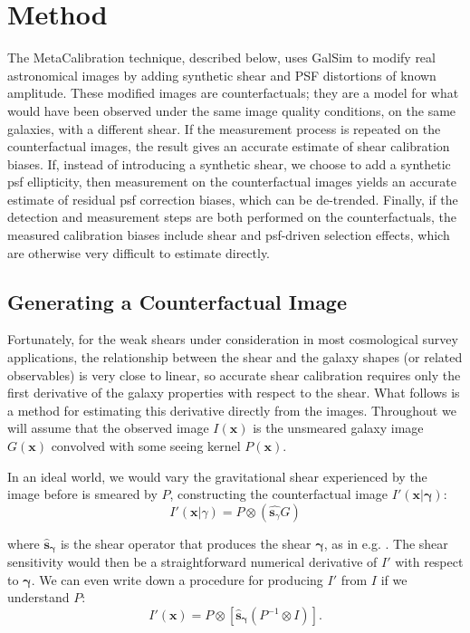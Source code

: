 \documentclass[iop]{emulateapj}
\begin{document}
\section{Method}
The MetaCalibration technique, described below, uses GalSim
\citep{2015A&C....10..121R} to modify real astronomical images by
adding synthetic shear and PSF distortions of known amplitude. These
modified images are counterfactuals; they are a model for what would
have been observed under the same image quality conditions, on the
same galaxies, with a different shear. If the measurement process is
repeated on the counterfactual images, the result gives an accurate
estimate of shear calibration biases. If, instead of introducing a
synthetic shear, we choose to add a synthetic psf ellipticity, then
measurement on the counterfactual images yields an accurate estimate
of residual psf correction biases, which can be de-trended.  Finally,
if the detection and measurement steps are both performed on the
counterfactuals, the measured calibration biases include shear and
psf-driven selection effects, which are otherwise very difficult to
estimate directly.

\subsection{Generating a Counterfactual Image}
Fortunately, for the weak shears under consideration in most
cosmological survey applications, the relationship between the shear
and the galaxy shapes (or related observables) is very close to
linear, so accurate shear calibration requires only the first
derivative of the galaxy properties with respect to the shear. What
follows is a method for estimating this derivative directly from the
images. Throughout we will assume that the observed image
$I({\mathbf{x}})$ is the unsmeared galaxy image $G(\mathbf{x})$
convolved with some seeing kernel $P(\mathbf{x})$.

In an ideal world, we would vary the gravitational shear experienced
by the image before is smeared by $P$, constructing the counterfactual
image $I'(\mathbf{x}| {\boldsymbol \gamma})$:
\begin{equation}
  I'({\mathbf{x}}|\gamma) = P \otimes\left( \hat{\mathbf{s}_{\gamma}}G\right)
\end{equation}

where $\hat{\mathbf{s}}_{\boldsymbol \gamma}$ is the shear operator that produces the shear
${\boldsymbol \gamma}$, as in e.g. \cite{2002AJ....123..583B}. The
shear sensitivity would then be a straightforward numerical derivative
of $I'$ with respect to ${\boldsymbol \gamma}$. We can even write down
a procedure for producing $I'$ from $I$ if we understand $P$:
\begin{equation}
  I'({\mathbf{x}}) = P \otimes \left[\hat{\mathbf{s}}_{\boldsymbol \gamma}\left( P^{-1} \otimes I \right)\right].
\end{equation}
\end{document}
